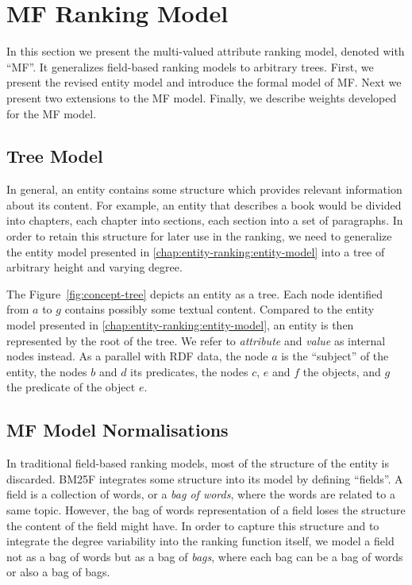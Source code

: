 \section{MF Ranking Model}
\label{chap:tree-ranking:mf-model}

In this section we present the multi-valued attribute ranking model, denoted with ``MF''. It generalizes field-based ranking models to arbitrary trees.
First, we present the revised entity model and introduce the formal model of MF. Next we present two extensions to the MF model. Finally, we describe weights developed for the MF model.

\subsection{Tree Model}

In general, an entity contains some structure which provides relevant information about its content. For example, an entity that describes a book would be divided into chapters, each chapter into sections, each section into a set of paragraphs. In order to retain this structure for later use in the ranking, we need to generalize the entity model presented in \ref{chap:entity-ranking:entity-model} into a tree of arbitrary height and varying degree.

The Figure~\ref{fig:concept-tree} depicts an entity as a tree. Each node identified from $a$ to $g$ contains possibly some textual content.
Compared to the entity model presented in \ref{chap:entity-ranking:entity-model}, an entity is then represented by the root of the tree. We refer to \emph{attribute} and \emph{value} as internal nodes instead.
As a parallel with RDF data, the node $a$ is the ``subject'' of the entity, the nodes $b$ and $d$ its predicates, the nodes $c$, $e$ and $f$ the objects, and $g$ the predicate of the object $e$.

\subsection{MF Model Normalisations}
\label{chap:tree-ranking:mf-model:norm}

In traditional field-based ranking models, most of the structure of the entity is discarded. BM25F integrates some structure into its model by defining ``fields''. A field is a collection of words, or a \emph{bag of words}, where the words are related to a same topic. However, the bag of words representation of a field loses the structure the content of the field might have. In order to capture this structure and to integrate the degree variability into the ranking function itself, we model a field not as a bag of words but as a bag of \emph{bags}, where each bag can be a bag of words or also a bag of bags.

